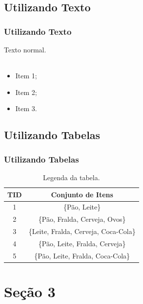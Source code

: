 \documentclass{beamer}
\begin{document}
\subsection{Utilizando Texto}
\begin{frame}\frametitle{Utilizando Texto}
	\justify Texto normal.
	\\~\\
	\begin{itemize}
		\item Item 1;
		\item Item 2;
		\item Item 3.	
	\end{itemize}
\end{frame}

\subsection{Utilizando Tabelas}
\begin{frame}\frametitle{Utilizando Tabelas}
	\begin{table}[h]
		\centering
		\begin{tabular}{c|c}
			\hline
			\textbf{\small TID} & \textbf{\small Conjunto de Itens}              \\\hline \hline
			{\small 1}          & {\small \{Pão, Leite\}}                       \\\hline
			{\small 2}          & {\small \{Pão, Fralda, Cerveja, Ovos\}}       \\\hline
			{\small 3}          & {\small \{Leite, Fralda, Cerveja, Coca-Cola\}} \\\hline
			{\small 4}          & {\small \{Pão, Leite, Fralda, Cerveja\}}      \\\hline
			{\small 5}          & {\small \{Pão, Leite, Fralda, Coca-Cola\}}    \\\hline
		\end{tabular}
		\caption{Legenda da tabela.}
		\label{t.transacao_mercado}
	\end{table}
\end{frame}

\section{Seção 3}
\end{document}
